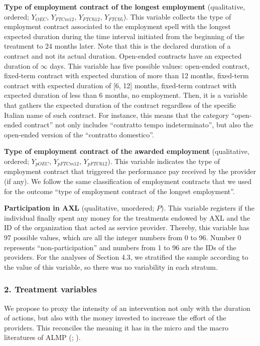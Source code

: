 \documentclass[
  11pt]{article}
\begin{document}
\textbf{Type of employment contract of the longest employment}
(qualitative, ordered; \(Y_{OEC}\), \(Y_{FTCm12}\), \(Y_{FTC612}\),
\(Y_{FTC05}\)). This variable collects the type of employment contract
associated to the employment spell with the longest expected duration
during the time interval initiated from the beginning of the treatment
to 24 months later. Note that this is the declared duration of a
contract and not its actual duration. Open-ended contracts have an
expected duration of \(\infty\) days. This variable has five possible
values: open-ended contract, fixed-term contract with expected duration
of more than 12 months, fixed-term contract with expected duration of
{[}6, 12{]} months, fixed-term contract with expected duration of less
than 6 months, no employment. Then, it is a variable that gathers the
expected duration of the contract regardless of the specific Italian
name of such contract. For instance, this means that the category
``open-ended contract'' not only includes ``contratto tempo
indeterminato'', but also the open-ended version of the ``contratto
domestico''.

\textbf{Type of employment contract of the awarded employment}
(qualitative, ordered; \(Y_{pOEC}\), \(Y_{pFTCm12}\), \(Y_{pFTC612}\)).
This variable indicates the type of employment contract that triggered
the performance pay received by the provider (if any). We follow the
same classification of employment contracts that we used for the outcome
``type of employment contract of the longest employment''.

\textbf{Participation in AXL} (qualitative, unordered; \(P\)). This
variable registers if the individual finally spent any money for the
treatments endowed by AXL and the ID of the organization that acted as
service provider. Thereby, this variable has 97 possible values, which
are all the integer numbers from 0 to 96. Number 0 represents
``non-participation'' and numbers from 1 to 96 are the IDs of the
providers. For the analyses of Section 4.3, we stratified the sample
according to the value of this variable, so there was no variability in
each stratum.

\subsubsection*{2. Treatment variables}\label{treatment-variables}

We propose to proxy the intensity of an intervention not only with the
duration of actions, but also with the money invested to increase the
effort of the providers. This reconciles the meaning it has in the micro
and the macro literatures of ALMP (; ).
\end{document}
